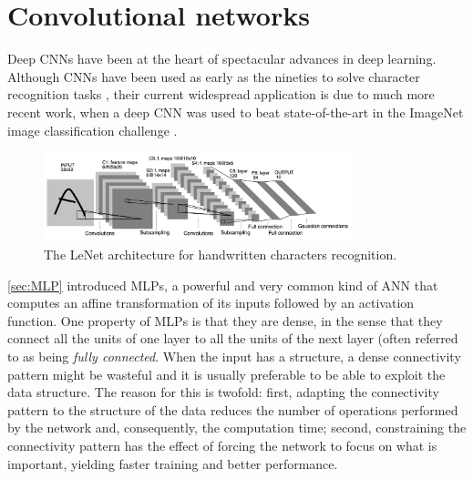 

\section{Convolutional networks}\label{sec:cnn}

Deep CNNs have been at the heart of spectacular advances in deep learning.
Although CNNs have been used as early as the nineties to solve character
recognition tasks \citep{le1997reading}, their current widespread application
is due to much more recent work, when a deep CNN was used to beat
state-of-the-art in the ImageNet image classification challenge
\citep{krizhevsky2012imagenet}.

\begin{figure}[h]
    \centering
    \includegraphics[width=0.8\textwidth]{img/lenet5.jpg}
    \caption{\label{fig:lenet} The LeNet architecture for handwritten
        characters recognition.}
\end{figure}

\autoref{sec:MLP} introduced MLPs, a powerful and very common kind of ANN that
computes an affine transformation of its inputs followed by an activation
function. One property of MLPs is that they are dense, in the sense that they
connect all the units of one layer to all the units of the next layer (often
referred to as being \emph{fully connected}. When the input has a structure, a
dense connectivity pattern might be wasteful and it is usually preferable to be
able to exploit the data structure. The reason for this is twofold: first,
adapting the connectivity pattern to the structure of the data reduces the
number of operations performed by the network and, consequently, the
computation time; second, constraining the connectivity pattern has the effect
of forcing the network to focus on what is important, yielding faster training
and better performance.

